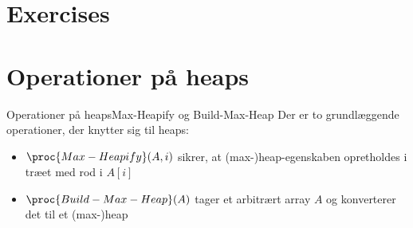 \documentclass[aspectratio=1610]{beamer}
\begin{document}
\section{Exercises}

\section{Operationer på heaps}

\begin{frame}{Operationer på heaps}{Max-Heapify og Build-Max-Heap}
    Der er to grundlæggende operationer, der knytter sig til heaps:

    \pause
    \begin{itemize}
        \item $\proc{Max-Heapify}(A, i)$ sikrer, at (max-)heap-egenskaben
            opretholdes i træet med rod i $A[i]$
            \pause
        \item $\proc{Build-Max-Heap}(A)$ tager et arbitrært array $A$ og
            konverterer det til et (max-)heap
    \end{itemize}
\end{frame}
\end{document}
